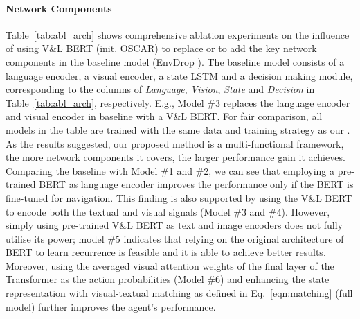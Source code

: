 \documentclass[final]{cvpr}
\begin{document}
\paragraph{Network Components}
Table~\ref{tab:abl_arch} shows comprehensive ablation experiments on the influence of using V\&L BERT (init. OSCAR) to replace or to add the key network components in the baseline model (EnvDrop \cite{tan2019learning}). The baseline model consists of a language encoder, a visual encoder, a state
LSTM and a decision making module, corresponding to the columns of \textit{Language}, \textit{Vision}, \textit{State} and \textit{Decision} in Table~\ref{tab:abl_arch}, respectively. E.g.,  Model \#3 replaces the language encoder and visual encoder in baseline with a V\&L BERT. For fair comparison, all models in the table are trained with the same data and training strategy as our \vlnbert. 
As the results suggested, our proposed method is a multi-functional framework, the more network components it covers, the larger performance gain it achieves. Comparing the baseline with Model \#1 and \#2, we can see that employing a pre-trained BERT as language encoder improves the performance only if the BERT is fine-tuned for navigation. This finding is also supported by using the V\&L BERT to encode both the textual and visual signals (Model \#3 and \#4). However, simply using pre-trained V\&L BERT as text and image encoders does not fully utilise its power; model \#5 indicates that relying on the original architecture of BERT to learn recurrence is feasible and it is able to achieve better results. Moreover, using the averaged visual attention weights of the final layer of the Transformer as the action probabilities (Model \#6) and enhancing the state representation with visual-textual matching as defined in Eq.~\ref{eqn:matching} (full model) further improves the agent's performance. 

\vspace{-10pt}
\end{document}
